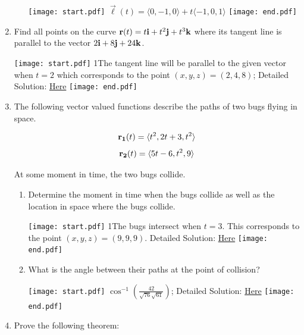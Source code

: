 \documentclass[12pt]{article}
\begin{document}
\begin{enumerate}
\begin{enumerate}
\texttt{[image: start.pdf]}
{{$\overrightarrow{\ell}(t)=\langle 0,-1,0 \rangle + t\langle -1, 0, 1\rangle$}}
\texttt{[image: end.pdf]}


\end{enumerate}

\item Find all points on the curve ${\bf r}(t)=t{\bf i}+t^2{\bf j}+t^3{\bf k}$ where its tangent line is parallel to the vector $2{\bf i}+8{\bf j}+24{\bf k}$.

\texttt{[image: start.pdf]}
{{{1\linewidth}{The tangent line will be parallel to the given vector when $t=2$ which corresponds to the point $(x,y,z)=(2,4,8)$; Detailed Solution: \textcolor{blue}{\href{http://www.math.drexel.edu/classes/Calculus/resources/Math200HW/Solutions/08_200_Vector_Functions_07.pdf}{Here}} }}}
\texttt{[image: end.pdf]}


\item The following vector valued functions describe the paths of two bugs flying in space.  

$${\bf r_1}(t)=\langle t^2, 2t+3, t^2\rangle$$
$${\bf r_2}(t)=\langle 5t-6, t^2, 9\rangle$$

At some moment in time, the two bugs collide.

\begin{enumerate}

\item Determine the moment in time when the bugs collide as well as the location in space where the bugs collide.

\texttt{[image: start.pdf]}
{{{1\linewidth}{The bugs intersect when $t=3$.  This corresponds to the point $(x,y,z)=(9,9,9)$. Detailed Solution: \textcolor{blue}{\href{http://www.math.drexel.edu/classes/Calculus/resources/Math200HW/Solutions/08_200_Vector_Functions_08.pdf}{Here}}}}}
\texttt{[image: end.pdf]}


\item What is the angle between their paths at the point of collision?

\texttt{[image: start.pdf]}
{{$\cos^{-1}\left(\frac{42}{\sqrt{76}\sqrt{61}}\right)$; Detailed Solution: \textcolor{blue}{\href{http://www.math.drexel.edu/classes/Calculus/resources/Math200HW/Solutions/08_200_Vector_Functions_08.pdf}{Here}}}}
\texttt{[image: end.pdf]}


\end{enumerate}

\item Prove the following theorem:


\end{enumerate}
\end{document}
